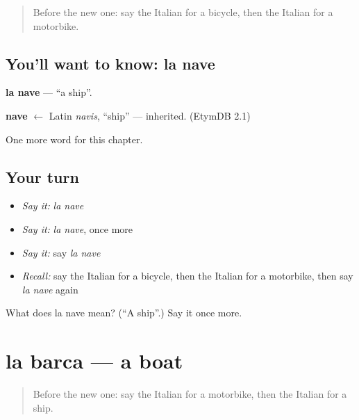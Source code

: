 \label{lesson:IT-C93-nave}



\begin{quote}
Before the new one: say the Italian for a bicycle, then the Italian for a motorbike.
\end{quote}

\subsection*{You'll want to know: la nave}
\textbf{la nave} — \textquotedblleft{}a ship\textquotedblright{}.

\begin{cousinweb}
\textbf{nave} $\leftarrow$ Latin \emph{navis}, \textquotedblleft{}ship\textquotedblright{} — inherited. (EtymDB 2.1)
\end{cousinweb}

\begin{grammarlens}[title={What you've built}]
One more word for this chapter.
\end{grammarlens}

\subsection*{Your turn}
\begin{itemize}
\raggedright
  \item \emph{Say it:} \emph{la nave}
  \item \emph{Say it:} \emph{la nave}, once more
  \item \emph{Say it:} say \emph{la nave}
  \item \emph{Recall:} say the Italian for a bicycle, then the Italian for a motorbike, then say \emph{la nave} again
\end{itemize}

\begin{tcolorbox}[breakable,colback=teal!4,colframe=teal!35!black,title={Before you move on}]
What does la nave mean? (\textquotedblleft{}A ship\textquotedblright{}.) Say it once more.
\end{tcolorbox}
\section[la barca]{la barca — a boat}

\label{lesson:IT-C93-barca}



\begin{quote}
Before the new one: say the Italian for a motorbike, then the Italian for a ship.
\end{quote}

